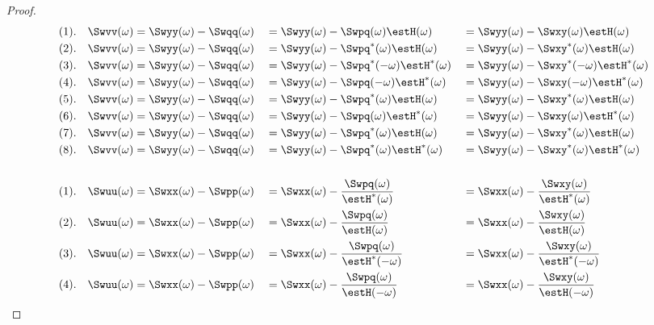 \begin{proof}
\newpage
\begin{align*}
    (1).\quad \Swvv(\omega) &= \Swyy(\omega) - \Swqq(\omega) &&= \Swyy(\omega) - \Swpq     ( \omega)\estH     (\omega) &&= \Swyy(\omega) - \Swxy     ( \omega)\estH     (\omega) 
  \\(2).\quad \Swvv(\omega) &= \Swyy(\omega) - \Swqq(\omega) &&= \Swyy(\omega) - \Swpq^\ast( \omega)\estH     (\omega) &&= \Swyy(\omega) - \Swxy^\ast( \omega)\estH     (\omega) 
  \\(3).\quad \Swvv(\omega) &= \Swyy(\omega) - \Swqq(\omega) &&= \Swyy(\omega) - \Swpq^\ast(-\omega)\estH^\ast(\omega) &&= \Swyy(\omega) - \Swxy^\ast(-\omega)\estH^\ast(\omega) 
  \\(4).\quad \Swvv(\omega) &= \Swyy(\omega) - \Swqq(\omega) &&= \Swyy(\omega) - \Swpq     (-\omega)\estH^\ast(\omega) &&= \Swyy(\omega) - \Swxy     (-\omega)\estH^\ast(\omega) 
  \\(5).\quad \Swvv(\omega) &= \Swyy(\omega) - \Swqq(\omega) &&= \Swyy(\omega) - \Swpq^\ast( \omega)\estH     (\omega) &&= \Swyy(\omega) - \Swxy^\ast( \omega)\estH     (\omega) 
  \\(6).\quad \Swvv(\omega) &= \Swyy(\omega) - \Swqq(\omega) &&= \Swyy(\omega) - \Swpq     ( \omega)\estH^\ast(\omega) &&= \Swyy(\omega) - \Swxy     ( \omega)\estH^\ast(\omega) 
  \\(7).\quad \Swvv(\omega) &= \Swyy(\omega) - \Swqq(\omega) &&= \Swyy(\omega) - \Swpq^\ast( \omega)\estH     (\omega) &&= \Swyy(\omega) - \Swxy^\ast( \omega)\estH     (\omega) 
  \\(8).\quad \Swvv(\omega) &= \Swyy(\omega) - \Swqq(\omega) &&= \Swyy(\omega) - \Swpq^\ast( \omega)\estH^\ast(\omega) &&= \Swyy(\omega) - \Swxy^\ast( \omega)\estH^\ast(\omega) 
  \\
  \\(1).\quad \Swuu(\omega) &= \Swxx(\omega) - \Swpp(\omega) &&= \Swxx(\omega) - \frac{\Swpq(\omega)}{\estH^\ast( \omega)} &&= \Swxx(\omega) - \frac{\Swxy(\omega)}{\estH^\ast( \omega)}
  \\(2).\quad \Swuu(\omega) &= \Swxx(\omega) - \Swpp(\omega) &&= \Swxx(\omega) - \frac{\Swpq(\omega)}{\estH     ( \omega)} &&= \Swxx(\omega) - \frac{\Swxy(\omega)}{\estH     ( \omega)}
  \\(3).\quad \Swuu(\omega) &= \Swxx(\omega) - \Swpp(\omega) &&= \Swxx(\omega) - \frac{\Swpq(\omega)}{\estH^\ast(-\omega)} &&= \Swxx(\omega) - \frac{\Swxy(\omega)}{\estH^\ast(-\omega)}
  \\(4).\quad \Swuu(\omega) &= \Swxx(\omega) - \Swpp(\omega) &&= \Swxx(\omega) - \frac{\Swpq(\omega)}{\estH     (-\omega)} &&= \Swxx(\omega) - \frac{\Swxy(\omega)}{\estH     (-\omega)}

\end{align*}
\end{proof}
